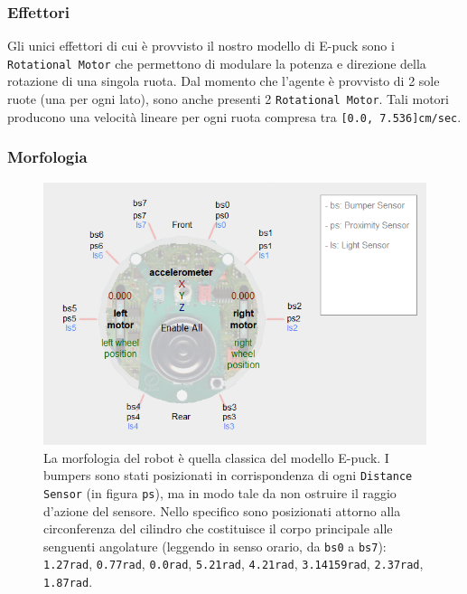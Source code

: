 \newpage

\subsubsection{Effettori}

Gli unici effettori di cui è provvisto il nostro modello di E-puck sono i \texttt{Rotational Motor} che permettono di modulare la potenza e direzione della rotazione di una singola ruota. Dal momento che l'agente è provvisto di 2 sole ruote (una per ogni lato), sono anche presenti 2 \texttt{Rotational Motor}. Tali motori producono una velocità lineare per ogni ruota compresa tra \texttt{[0.0, 7.536]cm/sec}.

\subsubsection{Morfologia}

\begin{figure}[H]
    \centering
    \includegraphics[scale=0.9]{figures/epuck_morphology.png}
    \caption{La morfologia del robot è quella classica del modello E-puck. I bumpers sono stati posizionati in corrispondenza di ogni \texttt{Distance Sensor} (in figura \texttt{ps}), ma in modo tale da non ostruire il raggio d'azione del sensore. Nello specifico sono posizionati attorno alla circonferenza del cilindro che costituisce il corpo principale alle senguenti angolature (leggendo in senso orario, da \texttt{bs0} a \texttt{bs7}): \texttt{1.27rad}, \texttt{0.77rad}, \texttt{0.0rad}, \texttt{5.21rad}, \texttt{4.21rad}, \texttt{3.14159rad}, \texttt{2.37rad}, \texttt{1.87rad}.}
    \label{fig:Morphology}
\end{figure}

